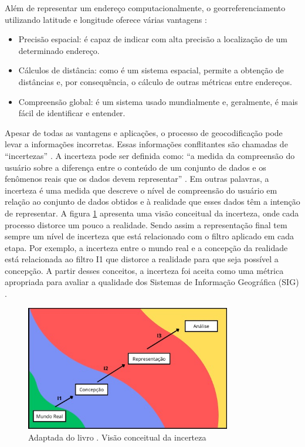 Além de representar um endereço computacionalmente, o georreferenciamento utilizando latitude e longitude oferece várias vantagens \cite{longley2013}:

\begin{itemize}
   \item Precisão espacial: é capaz de indicar com alta precisão a localização de um determinado endereço.
   \item Cálculos de distância: como é um sistema espacial, permite a obtenção de distâncias e, por consequência, o cálculo de outras métricas entre endereços.
   \item Compreensão global: é um sistema usado mundialmente e, geralmente, é mais fácil de identificar e entender.
\end{itemize}

Apesar de todas as vantagens e aplicações, o processo de geocodificação pode levar a informações incorretas. Essas informações conflitantes são chamadas de ``incertezas'' \cite{longley2013}. A incerteza pode ser definida como: ``a medida da compreensão do usuário sobre a diferença entre o conteúdo de um conjunto de dados e os fenômenos reais que os dados devem representar'' \cite{longley2013}. Em outras palavras, a incerteza é uma medida que descreve o nível de compreensão do usuário em relação ao conjunto de dados obtidos e à realidade que esses dados têm a intenção de representar. A figura \ref{fig:incerteza} apresenta uma visão conceitual da incerteza, onde cada processo distorce um pouco a realidade. Sendo assim a representação final tem sempre um nível de incerteza que está relacionado com o filtro aplicado em cada etapa. Por exemplo, a incerteza entre o mundo real e a concepção da realidade está relacionada ao filtro I1 que distorce a realidade para que seja possível a concepção.  A partir desses conceitos, a incerteza foi aceita como uma métrica apropriada para avaliar a qualidade dos Sistemas de Informação Geográfica (SIG) \cite{longley2013}.

\begin{figure}[ht]
   \centering
   \includegraphics[width=0.8\textwidth]{Figuras/incertezaMeu.jpeg}
   \caption{Adaptada do livro \cite{longley2013}. Visão conceitual da incerteza}
   \label{fig:incerteza}
\end{figure}

